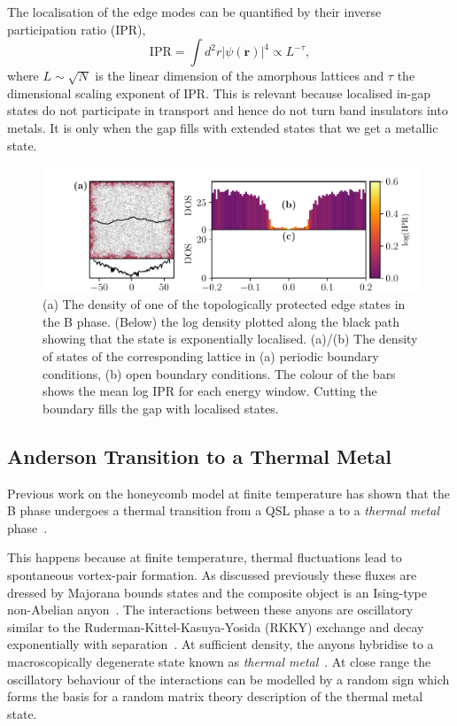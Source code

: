 The localisation of the edge modes can be quantified by their inverse participation ratio (IPR), \[\mathrm{IPR} = \int d^2r|\psi(\mathbf{r})|^4  \propto L^{-\tau},\] where \(L\sim\sqrt{N}\) is the linear dimension of the amorphous lattices and \(\tau\) the dimensional scaling exponent of IPR. This is relevant because localised in-gap states do not participate in transport and hence do not turn band insulators into metals. It is only when the gap fills with extended states that we get a metallic state.

\hypertarget{fig:edge_modes}{%
\begin{figure}
\centering
\includegraphics[width=1\textwidth,height=\textheight]{figure_code/amk_chapter/results/edge_modes/edge_modes}
\caption[{Edges States and Density of States}]{(a) The density of one of the topologically protected edge states in the B phase. (Below) the log density plotted along the black path showing that the state is exponentially localised. (a)/(b) The density of states of the corresponding lattice in (a) periodic boundary conditions, (b) open boundary conditions. The colour of the bars shows the mean log IPR for each energy window. Cutting the boundary fills the gap with localised states.}
\label{fig:edge_modes}
\end{figure}
}

\hypertarget{anderson-transition-to-a-thermal-metal}{%
\subsection{Anderson Transition to a Thermal Metal}\label{anderson-transition-to-a-thermal-metal}}

Previous work on the honeycomb model at finite temperature has shown that the B phase undergoes a thermal transition from a QSL phase a to a \emph{thermal metal} phase~\autocite{selfThermallyInducedMetallic2019}.

This happens because at finite temperature, thermal fluctuations lead to spontaneous vortex-pair formation. As discussed previously these fluxes are dressed by Majorana bounds states and the composite object is an Ising-type non-Abelian anyon~\autocite{Beenakker2013}. The interactions between these anyons are oscillatory similar to the Ruderman-Kittel-Kasuya-Yosida (RKKY) exchange and decay exponentially with separation~\autocite{Laumann2012,Lahtinen_2011,lahtinenTopologicalLiquidNucleation2012}. At sufficient density, the anyons hybridise to a macroscopically degenerate state known as \emph{thermal metal}~\autocite{Laumann2012}. At close range the oscillatory behaviour of the interactions can be modelled by a random sign which forms the basis for a random matrix theory description of the thermal metal state.

